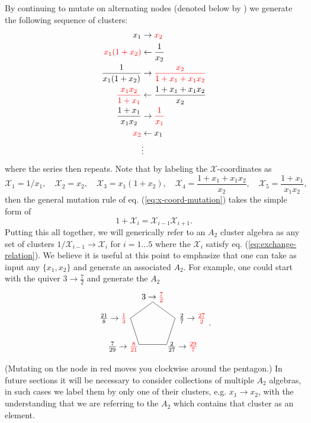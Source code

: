 \documentclass[11pt]{article}
\def\nl{\nonumber\\}
\def\nn{\nonumber}
\def\x{\mathcal{X}}
\def\drawPentagon{
\coordinate (P1) at (90:1);
\coordinate (P2) at (18:1);
\coordinate (P3) at (306:1);
\coordinate (P4) at (234:1);
\coordinate (P5) at (162:1);
\draw (P1) -- (P2) -- (P3) -- (P4) -- (P5) -- cycle;
}
\begin{document}
By continuing to mutate on alternating nodes (denoted below by \mbox{\color{red}{red}}) we generate the following sequence of clusters:
\begin{align}
  x_1 &\to \color{red}{x_2} \nl
  \color{red}{x_1(1+x_2)} &\leftarrow \frac{1}{x_2} \nl
  \frac{1}{x_1(1+x_2)} &\to \color{red}{\frac{x_2}{1+x_1+x_1 x_2}} \\
  \color{red}{\frac{x_1 x_2}{1+x_1}} &\leftarrow \frac{1+x_1+x_1 x_2}{x_2} \nl
  \frac{1+x_1}{x_1 x_2} &\to \color{red}{\frac{1}{x_1}} \nl
  \color{red}{x_2} &\leftarrow x_1 \nl
  &\vdots \nn
\end{align}
where the series then repeats. Note that by labeling the $\x$-coordinates as
\begin{equation}\label{def:a2-xcoords}
  \x_1 = 1/x_1, \quad \x_2 = x_2, \quad \x_3 = x_1(1+x_2), \quad 
  \x_4 = \frac{1+x_1+x_1 x_2}{x_2}, \quad \x_5 = \frac{1+x_1}{x_1 x_2},
\end{equation}
then the general mutation rule of eq. (\ref{eq:x-coord-mutation}) takes the simple form of
\begin{equation}\label{eq:exchange-relation}
  1+\x_i = \x_{i-1}\x_{i+1}.
\end{equation}
Putting this all together, we will generically refer to an $A_2$ cluster algebra as any set of clusters $1/\x_{i-1} \to \x_i$ for $i=1\ldots5$ where the $\x_i$ satisfy eq. (\ref{eq:exchange-relation}). We believe it is useful at this point to emphasize that one can take as input any $\{x_1, x_2\}$ and generate an associated $A_2$. For example, one could start with the quiver $3\to\frac{7}{2}$ and generate the $A_2$
\begin{equation}
\begin{gathered}
\begin{tikzpicture}
  \drawPentagon
  \draw (0,1.2) node {$3\to\color{red}{\frac{7}{2}}$};
  \draw (1,.3) node[anchor=west] {$\frac{2}{7} \to \color{red}{\frac{27}{2}} $};
  \draw (.5,-.9) node[anchor=west] {$\frac{2}{27} \to \color{red}{\frac{29}{7}}$};
  \draw (-.5,-.9) node[anchor=east] {$\frac{7}{29} \to \color{red}{\frac{8}{21}}$};
  \draw (-1,.3) node[anchor=east] {$\frac{21}{8} \to \color{red}{\frac{1}{3}}$};
\end{tikzpicture}
\end{gathered}.
\end{equation}
(Mutating on the node in red moves you clockwise around the pentagon.) In future sections it will be necessary to consider collections of multiple $A_2$ algebras, in such cases we label them by only one of their clusters, e.g. $x_1 \to x_2$, with the understanding that we are referring to the $A_2$ which contains that cluster as an element.
\end{document}
